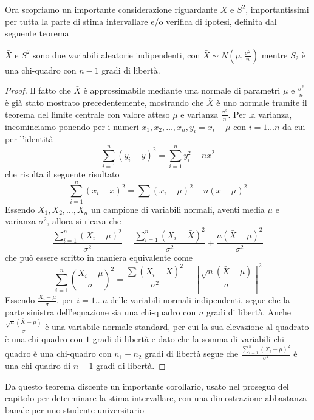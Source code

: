 \documentclass[a4paper,12pt, oneside]{book}
\begin{document}
Ora scopriamo un importante considerazione riguardante $\bar{X}$ e $S^2$, importantissimi per tutta la parte di 
stima intervallare e/o verifica di ipotesi, definita dal seguente teorema
\begin{teo}
    $\bar{X}$ e $S^2$ sono due variabili aleatorie indipendenti, con $\bar{X} \sim N(\mu, \frac{\sigma^2}{n})$ mentre 
    $S_2$ è una chi-quadro con $n - 1$ gradi di libertà.
\end{teo}
\begin{proof}
    Il fatto che $\bar{X}$ è approssimabile mediante una normale di parametri $\mu$ e $\frac{\sigma^2}{n}$ è già stato
    mostrato precedentemente, mostrando che $\bar{X}$ è uno normale tramite il teorema del limite centrale con valore
    atteso $\mu$ e varianza $\frac{\sigma^2}{n}$.\newline
    Per la varianza, incominciamo ponendo per i numeri $x_1, x_2, \dots, x_n, y_i = x_i - \mu$ con $i = 1\dots n$
    da cui per l'identità 
    \[ \sum _{i = 1}^n (y_i - \bar{y})^2 = \sum _{i = 1}^n y_i^2 - n\bar{x}^2 \]
    che risulta il seguente risultato
    \[ \sum _{i = 1}^n (x_i - \bar{x})^2 = \sum (x_i - \mu)^2 - n(\bar{x} - \mu)^2 \]
    Essendo $X_1, X_2, \dots, X_n$ un campione di variabili normali, aventi media $\mu$ e varianza $\sigma^2$, allora si
    ricava che 
    \[ \frac{\sum _{i = 1}^n (X_i - \mu)^2}{\sigma^2} = \frac{\sum _{i = 1}^n (X_i - \bar{X})^2}{\sigma^2} +
                                                        \frac{n(\bar{X} - \mu)^2}{\sigma^2}\]
    che può essere scritto in maniera equivalente come 
    \[ \sum _{i = 1}^n (\frac{X_i - \mu}{\sigma})^2 = \frac{\sum (X_i - \bar{X})^2}{\sigma^2} + 
                                                      [\frac{\sqrt{n}(\bar{X} - \mu)}{\sigma}]^2 \]
    Essendo $\frac{X_i - \mu}{\sigma}$, per $i = 1\dots n$ delle variabili normali indipendenti, segue che 
    la parte sinistra dell'equazione sia una chi-quadro con $n$ gradi di libertà.\newline
    Anche $\frac{\sqrt{n} (\bar{X} - \mu)}{\sigma}$ è una variabile normale standard, per cui la sua elevazione al
    quadrato è una chi-quadro con $1$ gradi di libertà e dato che la somma di variabili chi-quadro è una chi-quadro
    con $n_1 + n_2$ gradi di libertà segue che $\frac{\sum _{i = 1}^n (X_i - \mu)^2}{\sigma^2}$ è una chi-quadro
    di $n - 1$ gradi di libertà.
\end{proof}
Da questo teorema discente un importante corollario, usato nel proseguo del capitolo per determinare la stima
intervallare, con una dimostrazione abbastanza banale per uno studente universitario
\end{document}
